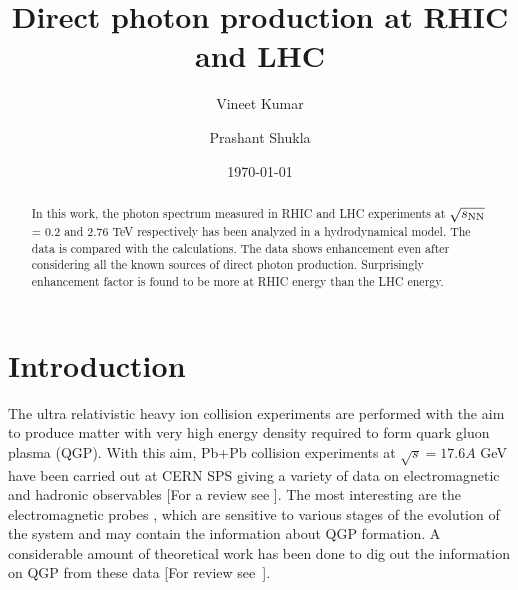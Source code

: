 \documentclass[aps,prc,preprint,superscriptaddress,showpacs,showkeys]{revtex4-1}
\begin{document}
\newcommand{\fm}{\mbox{fm}}
\newcommand{\MeV}{\mbox{MeV}}
\newcommand{\GeV}{\mbox{GeV}}

\title{{\Large Direct photon production at RHIC and LHC}}
\author{\large Vineet Kumar}
\author{\large Prashant Shukla}
\date{\today}



\begin{abstract}

In this work, the photon spectrum measured in RHIC and LHC  
experiments at $\sqrt{s_{\rm NN}}$ = 0.2 and 2.76 TeV respectively has been 
analyzed in a hydrodynamical model. The data is compared with the calculations.
The data shows enhancement even after considering all the known sources of
direct photon production. Surprisingly enhancement factor is found to be 
more at RHIC energy than the LHC energy. 
\end{abstract}


\maketitle

\section{Introduction} \label{Introduction}

  The ultra relativistic heavy ion collision experiments are performed 
with the aim to produce matter with very high energy density required to 
form quark gluon plasma (QGP). With this aim, Pb+Pb collision experiments 
at $\sqrt s = 17.6A$ GeV have been carried out at CERN SPS giving a 
variety of data on electromagnetic and hadronic observables
[For a review see \cite{ESKOLA}]. 
  The most interesting are the electromagnetic probes \cite{WA98}, 
which are sensitive to various stages of the evolution of the system and 
may contain the information about QGP formation. 
  A considerable amount of theoretical work has been done 
to dig out the information on QGP from these 
data [For review see~\cite{GALER,PEITZ}].
\end{document}
